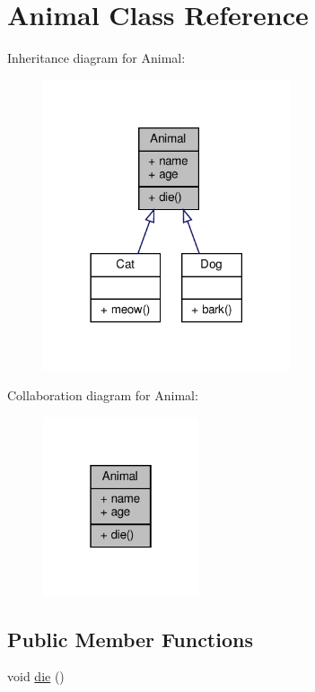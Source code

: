 \hypertarget{classAnimal}{}\section{Animal Class Reference}
\label{classAnimal}


Inheritance diagram for Animal\+:
\nopagebreak
\begin{figure}[H]
\begin{center}
\leavevmode
\includegraphics[width=206pt]{classAnimal__inherit__graph}
\end{center}
\end{figure}


Collaboration diagram for Animal\+:
\nopagebreak
\begin{figure}[H]
\begin{center}
\leavevmode
\includegraphics[width=130pt]{classAnimal__coll__graph}
\end{center}
\end{figure}
\subsection*{Public Member Functions}
\begin{DoxyCompactItemize}
\item 
void \hyperlink{classAnimal_a557fe0d71dda75be2f8459ce0d7c2275}{die} ()
\end{DoxyCompactItemize}
